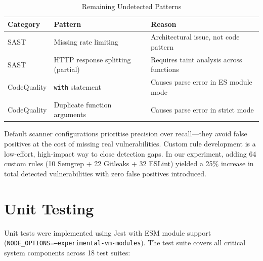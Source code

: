 \documentclass[12pt,a4paper]{report}
\begin{document}
\begin{table}[H]
\centering
\caption{Remaining Undetected Patterns}
\label{tab:remaining_gaps}
\begin{tabular}{|l|l|l|}
\hline
\textbf{Category} & \textbf{Pattern} & \textbf{Reason} \\
\hline
SAST & Missing rate limiting & Architectural issue, not code pattern \\
\hline
SAST & HTTP response splitting (partial) & Requires taint analysis across functions \\
\hline
CodeQuality & \texttt{with} statement & Causes parse error in ES module mode \\
\hline
CodeQuality & Duplicate function arguments & Causes parse error in strict mode \\
\hline
\end{tabular}
\end{table}

\begin{lessonbox}
Default scanner configurations prioritise precision over recall---they avoid false positives at the cost of missing real vulnerabilities. Custom rule development is a low-effort, high-impact way to close detection gaps. In our experiment, adding 64 custom rules (10 Semgrep + 22 Gitleaks + 32 ESLint) yielded a 25\% increase in total detected vulnerabilities with zero false positives introduced.
\end{lessonbox}

\section{Unit Testing}

Unit tests were implemented using Jest with ESM module support (\texttt{NODE\_OPTIONS=--experimental-vm-modules}). The test suite covers all critical system components across 18 test suites:
\end{document}
